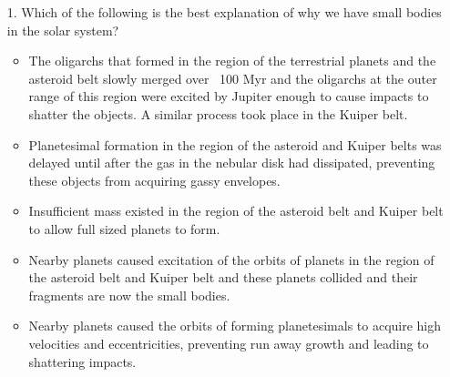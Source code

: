 \begin{enumerate}
    \item[1.] Which of the following is the best explanation of why we have small bodies in the solar system?
    \begin{multicols}{2} \begin{itemize}[label={$\bullet$}]
        \item The oligarchs that formed in the region of the terrestrial planets and the asteroid belt slowly merged over ~100 Myr and the oligarchs at the outer range of this region were excited by Jupiter enough to cause impacts to shatter the objects. A similar process took place in the Kuiper belt.
        \item Planetesimal formation in the region of the asteroid and Kuiper belts was delayed until after the gas in the nebular disk had dissipated, preventing these objects from acquiring gassy envelopes.
        \item Insufficient mass existed in the region of the asteroid belt and Kuiper belt to allow full sized planets to form.
        \item Nearby planets caused excitation of the orbits of planets in the region of the asteroid belt and Kuiper belt and these planets collided and their fragments are now the small bodies.
        \item Nearby planets caused the orbits of forming planetesimals to acquire high velocities and eccentricities, preventing run away growth and leading to shattering impacts.
    \end{itemize}\end{multicols}       


\end{enumerate}
